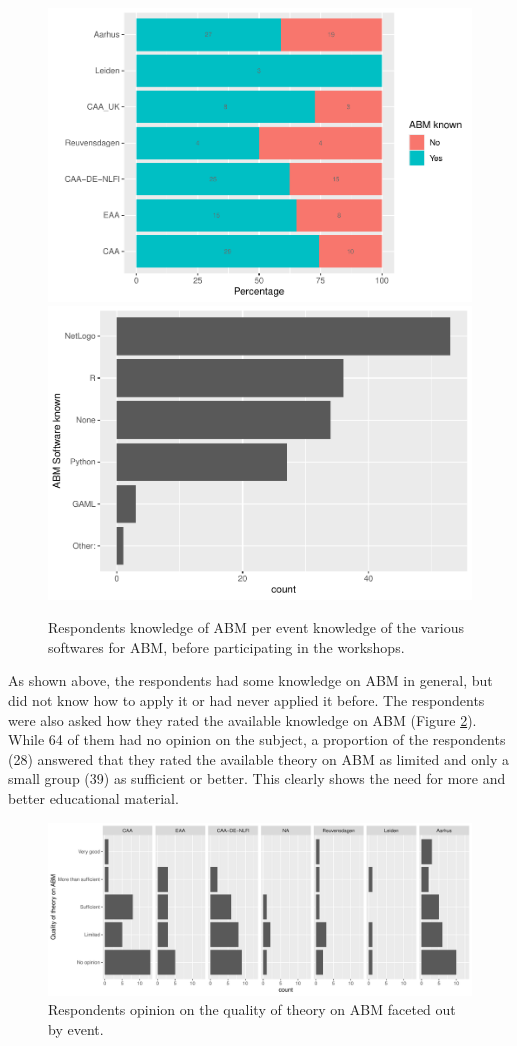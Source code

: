 \documentclass[
]{article}
\begin{document}
\begin{figure}
\includegraphics[width=0.5\linewidth]{paper_files/figure-latex/abm-knowledge-1} \includegraphics[width=0.5\linewidth]{paper_files/figure-latex/abm-knowledge-2} \caption{Respondents knowledge of ABM per event knowledge of the various softwares for ABM, before participating in the workshops.}\label{fig:abm-knowledge}
\end{figure}

As shown above, the respondents had some knowledge on ABM in general, but did not know how to apply it or had never applied it before. The respondents were also asked how they rated the available knowledge on ABM (Figure \ref{fig:available-theory}). While 64 of them had no opinion on the subject, a proportion of the respondents (28) answered that they rated the available theory on ABM as limited and only a small group (39) as sufficient or better. This clearly shows the need for more and better educational material.

\begin{figure}
\centering
\includegraphics{paper_files/figure-latex/available-theory-1.pdf}
\caption{\label{fig:available-theory}Respondents opinion on the quality of theory on ABM faceted out by event.}
\end{figure}
\end{document}
